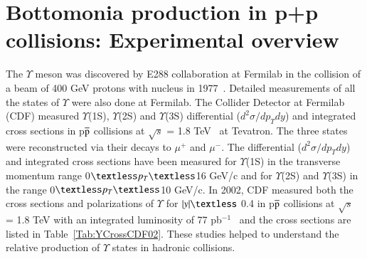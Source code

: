 \section{Bottomonia production in p+p collisions: Experimental overview}

The $\Upsilon$ meson was discovered by E288 collaboration at Fermilab in the collision of
a beam of 400 GeV protons with nucleus in 1977~\cite{PhysRevLett.39.252}.
Detailed measurements of all the states of $\Upsilon$ were also done at Fermilab.
The Collider Detector at Fermilab (CDF) measured $\Upsilon$(1S), $\Upsilon$(2S) and $\Upsilon$(3S) 
differential ($d^{2}\sigma/dp_{T}dy$) and integrated cross sections in p$\overline{\rm p}$
collisions at $\surd s$ = 1.8 TeV~\cite{CDF:1995gwi} at Tevatron.
The three states were reconstructed via their decays 
to $\mu^{+}$ and $\mu^{-}$. The differential ($d^{2}\sigma/dp_{T}dy$) and integrated
cross sections have been measured for  $\Upsilon$(1S) in the transverse momentum range
0$\textless p_{T} \textless$16 GeV/c and for $\Upsilon$(2S) and $\Upsilon$(3S)
in the range 0$\textless p_{T}\textless$10 GeV/c.
  In 2002, CDF measured both the cross sections and polarizations of $\Upsilon$
for $|y|\textless$ 0.4 in p$\overline{\rm p}$ collisions at $\surd s$ = 1.8 TeV with
an integrated luminosity of 77 pb$^{-1}$~\cite{CDF:2001fdy} and the cross sections are
listed in Table~\ref{Tab:YCrossCDF02}. These studies helped to understand the
relative production of $\Upsilon$ states in hadronic collisions. 





